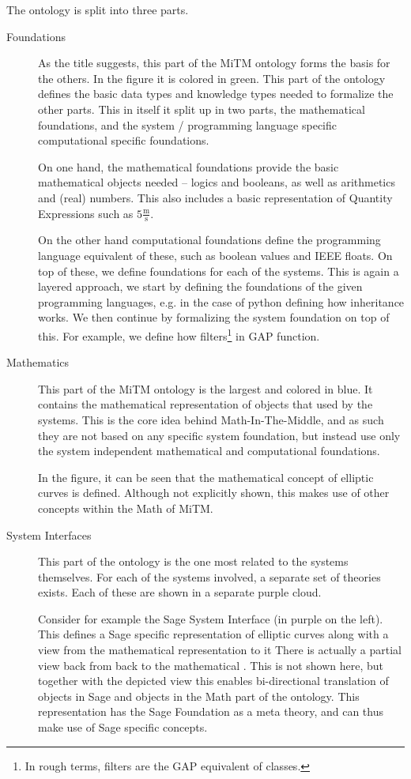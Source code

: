The ontology is split into three parts. 
\begin{description}
  \item[Foundations]
    As the title suggests, this part of the MiTM ontology forms the basis for the others. 
    In the figure it is colored in green. 
    This part of the ontology defines the basic data types and knowledge types needed to formalize the other parts. 
    This in itself it split up in two parts, the mathematical foundations, and the system / programming language specific computational specific foundations. 

    On one hand, the mathematical foundations provide the basic mathematical objects needed -- logics and booleans, as well as arithmetics and (real) numbers. 
    This also includes a basic representation of Quantity Expressions such as $5 \frac{\mathrm{m}}{\mathrm{s}}$. 

    On the other hand computational foundations define the programming language equivalent of these, such as boolean values and IEEE floats. 
    On top of these, we define foundations for each of the systems. 
    This is again a layered approach, we start by defining the foundations of the given programming languages, e.g. in the case of python defining how inheritance works. 
    We then continue by formalizing the system foundation on top of this. 
    For example, we define how filters\footnote{In rough terms, filters are the GAP equivalent of classes. } in GAP function. 

  \item[Mathematics]
    This part of the MiTM ontology is the largest and colored in blue. 
    It contains the mathematical representation of objects that used by the systems. 
    This is the core idea behind Math-In-The-Middle, and as such they are not based on any specific system foundation, but instead use only the system independent mathematical and computational foundations. 
    
    In the figure, it can be seen that the mathematical concept of elliptic curves is defined. 
    Although not explicitly shown, this makes use of other concepts within the Math of MiTM. 

  \item[System Interfaces]
    This part of the ontology is the one most related to the systems themselves. 
    For each of the systems involved, a separate set of theories exists. 
    Each of these are shown in a separate purple cloud. 

    Consider for example the Sage System Interface (in purple on the left). 
    This defines a Sage specific representation of elliptic curves along with a view from the mathematical representation to it
    There is actually a partial view back from  back to the mathematical . 
    This is not shown here, but together with the depicted view this enables bi-directional translation of objects in Sage and objects
    in the Math part of the ontology. 
    This representation has the Sage Foundation as a meta theory, and can thus make use of Sage specific concepts. 
    

\end{description}
